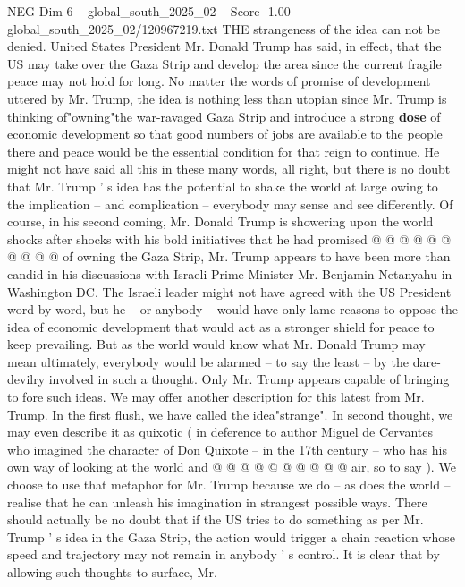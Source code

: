 \begin{textsample}{NEG Dim 6 – global\_south\_2025\_02 – Score -1.00 – global\_south\_2025\_02/120967219.txt}  \label{ex:f6_neg_036}
THE strangeness of the idea can not be denied.
United States President Mr.
Donald Trump has said, in effect, that the US may take over the Gaza Strip and develop the area since the current fragile peace may not hold for long.
No matter the words of promise of development uttered by Mr.
Trump, the idea is nothing less than utopian since Mr.
Trump is thinking of"owning"the war-ravaged Gaza Strip and introduce a strong \textbf{dose} of economic development so that good numbers of jobs are available to the people there and peace would be the essential condition for that reign to continue.
He might not have said all this in these many words, all right, but there is no doubt that Mr.
Trump ' s idea has the potential to shake the world at large owing to the implication -- and complication -- everybody may sense and see differently.
Of course, in his second coming, Mr.
Donald Trump is showering upon the world shocks after shocks with his bold initiatives that he had promised @ @ @ @ @ @ @ @ @ @ of owning the Gaza Strip, Mr.
Trump appears to have been more than candid in his discussions with Israeli Prime Minister Mr.
Benjamin Netanyahu in Washington DC.
The Israeli leader might not have agreed with the US President word by word, but he -- or anybody -- would have only lame reasons to oppose the idea of economic development that would act as a stronger shield for peace to keep prevailing.
But as the world would know what Mr.
Donald Trump may mean ultimately, everybody would be alarmed -- to say the least -- by the dare-devilry involved in such a thought.
Only Mr.
Trump appears capable of bringing to fore such ideas.
We may offer another description for this latest from Mr.
Trump.
In the first flush, we have called the idea"strange".
In second thought, we may even describe it as quixotic ( in deference to author Miguel de Cervantes who imagined the character of Don Quixote -- in the 17th century -- who has his own way of looking at the world and @ @ @ @ @ @ @ @ @ @ air, so to say ).
We choose to use that metaphor for Mr.
Trump because we do -- as does the world -- realise that he can unleash his imagination in strangest possible ways.
There should actually be no doubt that if the US tries to do something as per Mr.
Trump ' s idea in the Gaza Strip, the action would trigger a chain reaction whose speed and trajectory may not remain in anybody ' s control.
It is clear that by allowing such thoughts to surface, Mr.

\end{textsample}

